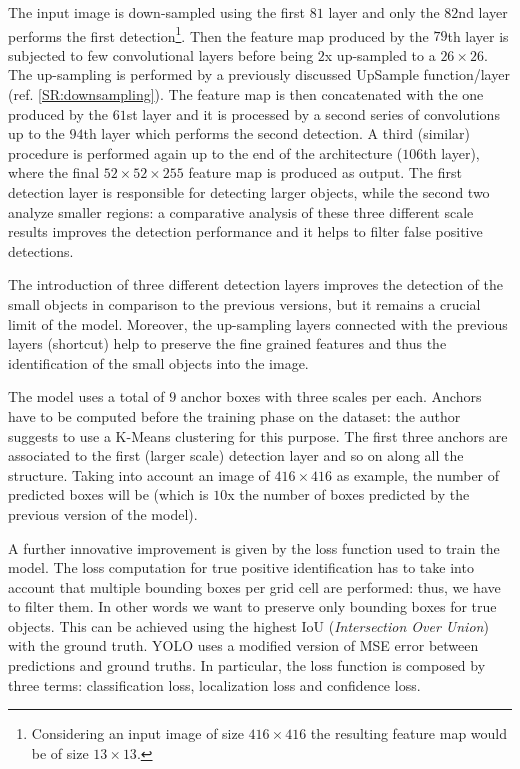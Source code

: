 \documentclass{standalone}
\begin{document}
The input image is down-sampled using the first $81$ layer and only the $82$nd layer performs the first detection\footnote{
  Considering an input image of size $416\times416$ the resulting feature map would be of size $13\times13$.
}.
Then the feature map produced by the $79$th layer is subjected to few convolutional layers before being $2$x up-sampled to a $26\times26$.
The up-sampling is performed by a previously discussed UpSample function/layer (ref. \ref{SR:downsampling}).
The feature map is then concatenated with the one produced by the $61$st layer and it is processed by a second series of convolutions up to the $94$th layer which performs the second detection.
A third (similar) procedure is performed again up to the end of the architecture ($106$th layer), where the final $52\times52\times255$ feature map is produced as output.
The first detection layer is responsible for detecting larger objects, while the second two analyze smaller regions: a comparative analysis of these three different scale results improves the detection performance and it helps to filter false positive detections.

The introduction of three different detection layers improves the detection of the small objects in comparison to the previous versions, but it remains a crucial limit of the model.
Moreover, the up-sampling layers connected with the previous layers (shortcut) help to preserve the fine grained features and thus the identification of the small objects into the image.

The model uses a total of $9$ anchor boxes with three scales per each.
Anchors have to be computed before the training phase on the dataset: the author suggests to use a K-Means clustering for this purpose.
The first three anchors are associated to the first (larger scale) detection layer and so on along all the structure.
Taking into account an image of $416\times416$ as example, the number of predicted boxes will be  (which is $10$x the number of boxes predicted by the previous version of the model).

A further innovative improvement is given by the loss function used to train the model.
The loss computation for true positive identification has to take into account that multiple bounding boxes per grid cell are performed: thus, we have to filter them.
In other words we want to preserve only bounding boxes  for true objects.
This can be achieved using the highest IoU (\emph{Intersection Over Union}) with the ground truth.
YOLO uses a modified version of MSE error between predictions and ground truths.
In particular, the loss function is composed by three terms: classification loss, localization loss and confidence loss.
\end{document}
